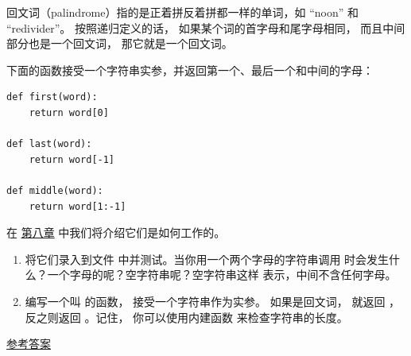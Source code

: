 \begin{exercise}
\label{palindrome}


回文词（palindrome）指的是正着拼反着拼都一样的单词，如 ``noon'' 和 ``redivider''。
按照递归定义的话， 如果某个词的首字母和尾字母相同， 而且中间部分也是一个回文词， 那它就是一个回文词。


下面的函数接受一个字符串实参，并返回第一个、最后一个和中间的字母：

\begin{lstlisting}
def first(word):
    return word[0]

def last(word):
    return word[-1]

def middle(word):
    return word[1:-1]
\end{lstlisting}

%

在 \hyperref[strings]{第八章} 中我们将介绍它们是如何工作的。


\begin{enumerate}

\item 将它们录入到文件  中并测试。当你用一个两个字母的字符串调用  时会发生什么？一个字母的呢？空字符串呢？空字符串这样  表示，中间不含任何字母。

\item 编写一个叫  的函数， 接受一个字符串作为实参。 如果是回文词， 就返回  ，反之则返回  。记住， 你可以使用内建函数  来检查字符串的长度。

\end{enumerate}


\href{http://thinkpython2.com/code/palindrome_soln.py}{参考答案}

\end{exercise}

